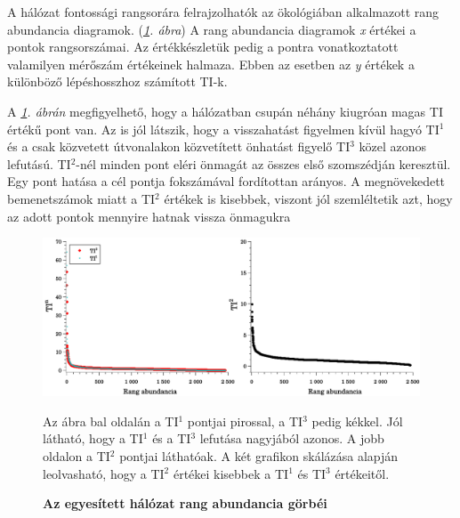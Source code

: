 \documentclass[a4paper,12pt]{article}
\newenvironment{imgdesc}{
		\small
		\singlespacing
		\begin{center}

	}{
		\end{center}
	}
\begin{document}
			A hálózat fontossági rangsorára felrajzolhatók az ökológiában alkalmazott rang abundancia diagramok.  (\textit{\ref{fig:mergedTIs}. ábra}) A rang abundancia diagramok \textit{x} értékei a pontok rangsorszámai. Az értékkészletük pedig a pontra vonatkoztatott valamilyen mérőszám értékeinek halmaza. Ebben az esetben az \textit{y} értékek a különböző lépéshosszhoz számított TI-k.

			A \textit{\ref{fig:mergedTIs}. ábrán} megfigyelhető, hogy a hálózatban csupán néhány kiugróan magas TI értékű pont van. Az is jól látszik, hogy a visszahatást figyelmen kívül hagyó TI$^1$ és a csak közvetett útvonalakon közvetített önhatást figyelő TI$^3$ közel azonos lefutású. TI$^2$-nél minden pont eléri önmagát az összes első szomszédján keresztül. Egy pont hatása a cél pontja fokszámával fordítottan arányos. A megnövekedett bemenetszámok miatt a TI$^2$ értékek is kisebbek, viszont jól szemléltetik azt, hogy az adott pontok mennyire hatnak vissza önmagukra

			\begin{figure}[H]
				\includegraphics[scale=0.5]{img/mergedTIs.pdf}
				\centering
				\caption{\textbf{ Az egyesített hálózat rang abundancia görbéi}}
				\begin{imgdesc}
					Az ábra bal oldalán a TI$^1$ pontjai pirossal, a TI$^3$ pedig kékkel. Jól látható, hogy a TI$^1$ és a TI$^3$ lefutása nagyjából azonos. A jobb oldalon a TI$^2$ pontjai láthatóak. A két grafikon skálázása alapján leolvasható, hogy a TI$^2$ értékei kisebbek a TI$^1$ és TI$^3$ értékeitől.
				\end{imgdesc}

				\label{fig:mergedTIs}
			\end{figure}
\end{document}
